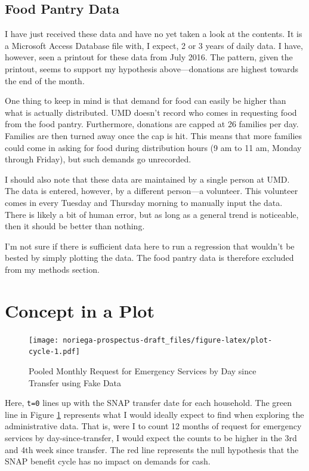 \documentclass[12pt,letterpaperpaper,]{book}
\begin{document}
\subsection*{Food Pantry Data}\label{food-pantry-data}

I have just received these data and have no yet taken a look at the
contents. It is a Microsoft Access Database file with, I expect, 2 or 3
years of daily data. I have, however, seen a printout for these data
from July 2016. The pattern, given the printout, seems to support my
hypothesis above---donations are highest towards the end of the month.

One thing to keep in mind is that demand for food can easily be higher
than what is actually distributed. UMD doesn't record who comes in
requesting food from the food pantry. Furthermore, donations are capped
at 26 families per day. Families are then turned away once the cap is
hit. This means that more families could come in asking for food during
distribution hours (9 am to 11 am, Monday through Friday), but such
demands go unrecorded.

I should also note that these data are maintained by a single person at
UMD. The data is entered, however, by a different person---a volunteer.
This volunteer comes in every Tuesday and Thursday morning to manually
input the data. There is likely a bit of human error, but as long as a
general trend is noticeable, then it should be better than nothing.

I'm not sure if there is sufficient data here to run a regression that
wouldn't be bested by simply plotting the data. The food pantry data is
therefore excluded from my methods section.

\newpage

\section*{Concept in a Plot}\label{concept-in-a-plot-2}

\begin{figure}
\centering
\texttt{[image: noriega-prospectus-draft\_files/figure-latex/plot-cycle-1.pdf]}
\caption{\label{fig:plot-cycle}Pooled Monthly Request for Emergency Services
by Day since Transfer using Fake Data}
\end{figure}

Here, \texttt{t=0} lines up with the SNAP transfer date for each
household. The green line in Figure \ref{fig:plot-cycle} represents what
I would ideally expect to find when exploring the administrative data.
That is, were I to count 12 months of request for emergency services by
day-since-transfer, I would expect the counts to be higher in the 3rd
and 4th week since transfer. The red line represents the null hypothesis
that the SNAP benefit cycle has no impact on demands for cash.
\end{document}
